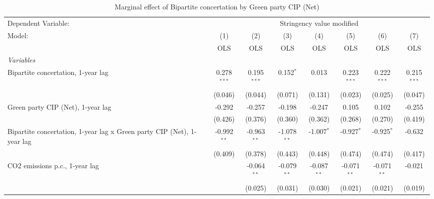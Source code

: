 
\begin{table}[htbp]
   \caption{Marginal effect of Bipartite concertation by Green party CIP (Net)}
   \centering
   \begin{tabular}{lccccccc}
      \toprule
      Dependent Variable: & \multicolumn{7}{c}{Stringency value modified}\\
      Model:                                                                 & (1)           & (2)           & (3)           & (4)           & (5)           & (6)           & (7)\\  
                                                                             &  OLS          & OLS           & OLS           & OLS           & OLS           & OLS           & OLS\\  
      \midrule
      \emph{Variables}\\
      Bipartite concertation, 1-year lag                                     & 0.278$^{***}$ & 0.195$^{***}$ & 0.152$^{*}$   & 0.013         & 0.223$^{***}$ & 0.222$^{***}$ & 0.215$^{***}$\\   
                                                                             & (0.046)       & (0.044)       & (0.071)       & (0.131)       & (0.023)       & (0.025)       & (0.047)\\   
      Green party CIP (Net), 1-year lag                                      & -0.292        & -0.257        & -0.198        & -0.247        & 0.105         & 0.102         & -0.255\\   
                                                                             & (0.426)       & (0.376)       & (0.360)       & (0.362)       & (0.268)       & (0.270)       & (0.419)\\   
      Bipartite concertation, 1-year lag x Green party CIP (Net), 1-year lag & -0.992$^{**}$ & -0.963$^{**}$ & -1.078$^{**}$ & -1.007$^{*}$  & -0.927$^{*}$  & -0.925$^{*}$  & -0.632\\   
                                                                             & (0.409)       & (0.378)       & (0.443)       & (0.448)       & (0.474)       & (0.474)       & (0.417)\\   
      CO2 emissions p.c., 1-year lag                                         &               & -0.064$^{**}$ & -0.079$^{**}$ & -0.087$^{**}$ & -0.071$^{**}$ & -0.071$^{**}$ & -0.021\\   
                                                                             &               & (0.025)       & (0.031)       & (0.030)       & (0.021)       & (0.021)       & (0.019)\\   

\end{tabular}
\end{table}
